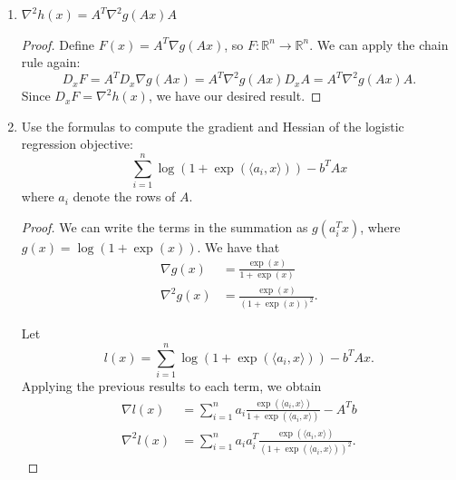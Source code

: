 \documentclass[11pt]{amsart}
\begin{document}
\begin{enumerate}
\begin{enumerate}
\begin{proof}
    The chain rule tells us that if $F(x) = G(H(x))$, then
    $D_x F = D_{H(x)} G \circ D_x H$. In this case, the composition operator is
    just matrix multiplication. We have that
    \begin{equation*}
      D_x h = D_{Ax} g \circ D_x A = D_{Ax} g \circ A,
    \end{equation*}
    which implies that
    \begin{align*}
      0
      &= \lim_{h \rightarrow 0} \frac{g(A(x + h)) - g(Ax) - \left(D_{Ax} g \circ A\right)h}{h} \\
      &= \lim_{h \rightarrow 0} \frac{g(A(x + h)) - g(Ax) - \langle A^T\left(D_{Ax} g\right)^T, h \rangle}{h} \\
      &= \lim_{h \rightarrow 0} \frac{g(A(x + h)) - g(Ax) - \langle A^T\nabla g(Ax), h \rangle}{h}.
    \end{align*}
    Thus, by definition, $\nabla h(x) = A^T \nabla g(Ax).$
  \end{proof}
\item $\nabla^2 h(x) = A^T \nabla^2 g(Ax) A$
  \begin{proof}
    Define $F(x) = A^T\nabla g(Ax)$, so
    $F: \mathbb{R}^n \rightarrow \mathbb{R}^n.$ We can apply the chain rule again:
    \begin{equation*}
      D_x F = A^T D_x  \nabla g(Ax) = A^T \nabla^2 g(Ax) D_xA = A^T \nabla^2 g(Ax) A.
    \end{equation*}
    Since $D_x F = \nabla^2 h(x)$, we have our desired result.    
  \end{proof}
\item Use the formulas to compute the gradient and Hessian of the logistic
  regression objective:
\[
\sum_{i=1}^n \log(1+\exp(\langle a_i, x\rangle))- b^TAx
\]
where $a_i$ denote the rows of $A$.

\begin{proof}
  We can write the terms in the summation as $g(a_i^Tx)$, where
  $g(x) = \log(1 + \exp(x))$. We have that
  \begin{align*}
    \nabla g(x) &= \frac{\exp(x)}{1 + \exp(x)} \\
    \nabla^2 g(x) &= \frac{\exp(x)}{\left(1 + \exp(x)\right)^2}.
  \end{align*}

  Let
  \begin{equation*}
    l(x) = \sum_{i=1}^n \log(1+\exp(\langle a_i, x\rangle))- b^TAx.
  \end{equation*}
  Applying the previous results to each term, we obtain
  \begin{align*}
    \nabla l(x) &= \sum_{i=1}^n a_i\frac{\exp(\langle a_i , x \rangle)}{1 + \exp(\langle a_i , x \rangle)} - A^Tb \\
    \nabla^2 l(x) &= \sum_{i=1}^n a_ia_i^T\frac{\exp(\langle a_i , x \rangle)}{\left(1 + \exp(\langle a_i , x \rangle)\right)^2}.
  \end{align*}
\end{proof}
\end{enumerate}


\end{enumerate}
\end{document}
